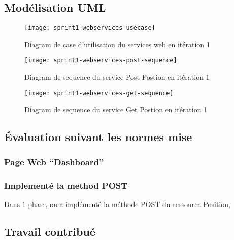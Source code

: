
\subsection{Modélisation UML}

\begin{figure}[htbp]
  \centering
  \texttt{[image: sprint1-webservices-usecase]}
  \caption{Diagram de case d'utilisation du services web en itération 1}
  \label{fig:sprint1-webservices-usecase}
\end{figure}

\begin{figure}[htbp]
  \centering
  \texttt{[image: sprint1-webservices-post-sequence]}
  \caption{Diagram de sequence du service Post Postion en itération 1}
  \label{fig:sprint1-webservices-post-sequence}
\end{figure}

\begin{figure}[htbp]
  \centering
  \texttt{[image: sprint1-webservices-get-sequence]}
  \caption{Diagram de sequence du service Get Postion en itération 1}
  \label{fig:sprint1-webservices-get-sequence}
\end{figure}

\subsection{Évaluation suivant les normes mise}

\subsubsection{Page Web ``Dashboard''}


\subsubsection{Implementé la method POST}

Dans 1\ier{} phase, on a implémenté la méthode POST du ressource Position,


\subsection{Travail contribué}

